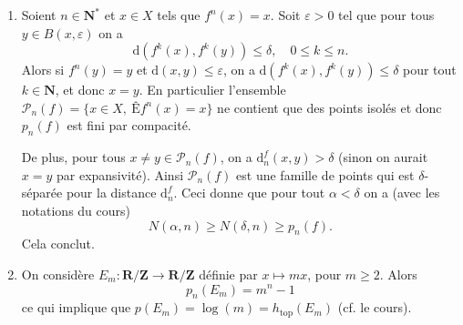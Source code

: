 \documentclass[a4paper,12pt,openany]{article}
\theoremstyle{plain}
\theoremstyle{definition}
\newcommand{\dd}{\mathrm{d}}
\newcommand{\R}{\mathbf{R}}
\newcommand{\Z}{\mathbf{Z}}
\newcommand{\N}{\mathbf{N}}
\newcommand{\htop}{h_\mathrm{top}}
\begin{document}
\begin{enumerate}
\item Soient $n \in \N^*$ et $x \in X$ tels que $f^n(x) = x$. Soit $\varepsilon > 0$ tel que pour tous $y \in B(x, \varepsilon)$ on a
$$
\dd(f^k(x), f^k(y)) \leq \delta, \quad 0 \leq k \leq n.
$$
Alors si $f^n(y) = y$ et $\dd(x,y) \leq \varepsilon$, on a $\dd(f^k(x), f^k(y)) \leq \delta$ pour tout $k \in \N$, et donc $x = y$. En particulier l'ensemble $\mathcal{P}_n(f) = \{x  \in X,~Êf^n(x) = x\}$ ne contient que des points isol\'es et donc $p_n(f)$ est fini par compacit\'e. 

De plus, pour tous $x\neq y \in \mathcal{P}_n(f)$, on a $\dd^f_n(x,y) > \delta$ (sinon on aurait $x=y$ par expansivit\'e). Ainsi $\mathcal{P}_n(f)$ est une famille de points qui est $\delta$-s\'epar\'ee pour la distance $\dd^f_n$. Ceci donne que pour tout $\alpha < \delta$ on a (avec les notations du cours)
$$
N(\alpha, n) \geq N(\delta, n) \geq p_n(f).
$$
Cela conclut.
\item On consid\`ere $E_m : \R/\Z \to \R/\Z$ d\'efinie par $x \mapsto mx$, pour $m \geq 2$. Alors
$$
p_n(E_m) = m^n-1
$$
ce qui implique que $p(E_m) = \log(m) = \htop(E_m)$ (cf. le cours).


\end{enumerate}
\end{document}
